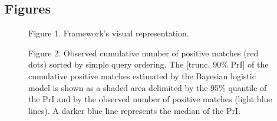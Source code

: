 \documentclass[]{bmcart}
\begin{document}
\begin{backmatter}



\section*{Figures}
		\begin{figure}[h!]
	 \caption*{Figure 1. Framework's visual representation.}
	\end{figure}
		\begin{figure}[h!]
	 \caption*{Figure 2. Observed cumulative number of positive matches
(red dots) sorted by simple query ordering. The {[}trunc. 90\% PrI{]} of
the cumulative positive matches estimated by the Bayesian logistic model
is shown as a shaded area delimited by the 95\% quantile of the PrI and
by the observed number of positive matches (light blue lines). A darker
blue line represents the median of the PrI.}
	\end{figure}
%



\end{backmatter}
\end{document}
